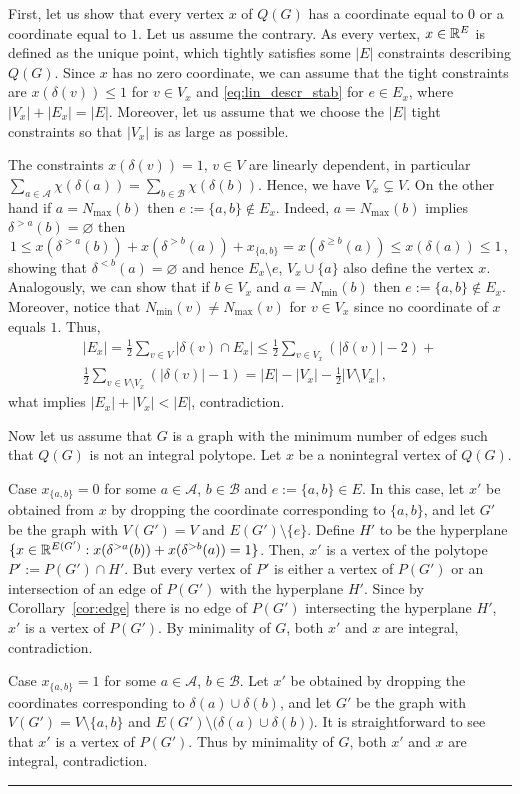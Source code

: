 \documentclass[preprint]{elsarticle}
\newenvironment{proof}{{\bf Proof:  }}{\hfill\rule{2mm}{2mm}}
\begin{document}
\begin{proof}
First, let us show that every vertex $x$ of $Q(G)$ has a coordinate equal to $0$ or a coordinate equal to $1$. Let us assume the contrary. As every vertex, $x\in \mathbb{R}^E$ is defined as the unique point, which tightly satisfies some $|E|$ constraints describing $Q(G)$. Since $x$ has no zero coordinate, we can assume  that the tight constraints are $x(\delta(v))\le 1$ for $v\in V_x$ and \eqref{eq:lin_descr_stab} for $e\in E_x$, where $|V_x|+|E_x|=|E|$. Moreover, let us assume that we choose the $|E|$ tight constraints so that $|V_x|$ is as large as possible. 

The constraints $x(\delta(v))=1$, $v\in V$ are linearly dependent, in particular $\sum_{a\in\mathcal{A}}\chi(\delta(a))=\sum_{b\in\mathcal{B}}\chi(\delta(b))$. Hence, we have $V_x\subsetneq V$. On the other hand if $a=N_{\max}(b)$ then $e:=\{a,b\}\not\in E_x$. Indeed, $a=N_{\max}(b)$ implies $\delta^{>a}(b)=\varnothing$ then
$$
	1\le x(\delta^{>a}(b))+ x(\delta^{>b}(a)) + x_{\{a,b\}}=x(\delta^{\ge b}(a)) \le x(\delta(a)) \le 1\,,
$$
showing that $\delta^{< b}(a)=\varnothing$ and hence $E_x\setminus e$, $V_x\cup \{a\}$ also define the vertex $x$. Analogously, we can show that if $b\in V_x$  and $a=N_{\min}(b)$ then $e:=\{a,b\}\not\in E_x$. Moreover, notice that $N_{\min}(v)\neq N_{\max}(v)$ for $v\in V_x$ since no coordinate of $x$ equals $1$. Thus, 
\begin{multline*}
	|E_x|=\frac{1}{2}\sum_{v\in V} |\delta(v)\cap E_x|\le \frac{1}{2}\sum_{v\in V_x} (|\delta(v)|-2)+\\\frac{1}{2}\sum_{v\in V\setminus V_x} (|\delta(v)|-1)= |E|-|V_x|-\frac{1}{2}|V\setminus V_x|\,,
\end{multline*}
what implies $|E_x|+|V_x|< |E|$, contradiction.

\bigskip

Now let us assume that $G$ is a graph with the minimum number of edges such that $Q(G)$ is not an integral polytope. Let $x$ be a nonintegral vertex of $Q(G)$.

Case $x_{\{a,b\}}=0$ for some $a\in \mathcal{A}$, $b\in\mathcal{B}$ and $e:=\{a,b\}\in E$. In this case, let $x'$ be obtained from $x$ by dropping the coordinate corresponding to $\{a,b\}$, and let $G'$ be the graph with $V(G')=V$ and $E(G')\setminus \{e\}$. Define $H'$ to be the hyperplane $\{x\in \mathbb{R}^{E(G')}: x(\delta^{>a}(b))+ x(\delta^{>b}(a))=1\}$. Then, $x'$ is a vertex of the polytope $P':=P(G')\cap H'$.
But every vertex of $P'$ is either a vertex of $P(G')$ or an intersection of an edge of $P(G')$ with the hyperplane $H'$. Since by Corollary~\ref{cor:edge} there is no edge of $P(G')$ intersecting the hyperplane $H'$, $x'$ is a vertex of $P(G')$. By minimality of $G$, both $x'$ and $x$ are integral, contradiction.

Case $x_{\{a,b\}}=1$ for some $a\in \mathcal{A}$, $b\in\mathcal{B}$. Let $x'$ be obtained by dropping the coordinates corresponding to $\delta(a)\cup\delta(b)$, and let $G'$ be the graph with $V(G')=V\setminus\{a,b\}$ and $E(G')\setminus \big(\delta(a)\cup\delta(b)\big)$. It is straightforward to see that $x'$ is a vertex of $P(G')$. Thus by minimality of $G$, both $x'$ and $x$ are integral, contradiction. 
\end{proof}




\end{document}
